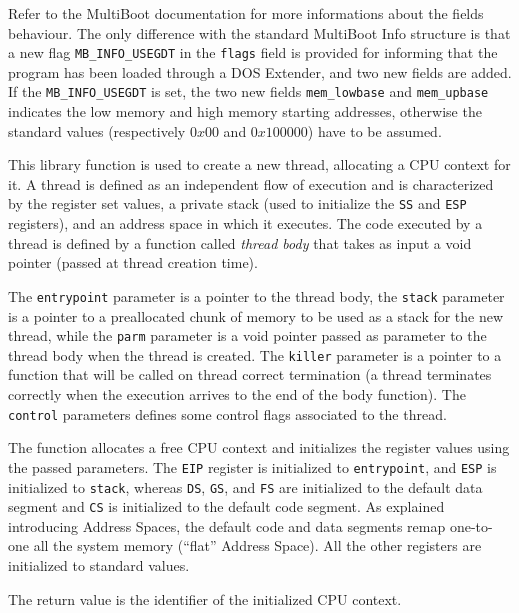 \documentclass[a4paper]{report}
\begin{document}
Refer to the MultiBoot documentation for more informations about the
fields behaviour. The only difference with the standard MultiBoot
Info structure is that a new flag {\tt MB\_INFO\_USEGDT} in the
{\tt flags} field is provided for informing that the program has been
loaded through a DOS Extender, and two new fields are added. If the
{\tt MB\_INFO\_USEGDT} is set, the two new fields {\tt mem\_lowbase}
and {\tt mem\_upbase} indicates the low memory and high memory
starting addresses, otherwise the standard values (respectively
$0x00$ and $0x100000$) have to be assumed.


This library function is used to create a new thread, allocating a
CPU context for it. A thread is defined as an independent flow of
execution and is characterized by the register set values, a private
stack (used to initialize the {\tt SS} and {\tt ESP} registers), and
an address space in which it executes. The code executed by a thread
is defined by a function called {\em thread body} that takes as input
a void pointer (passed at thread creation time).

The {\tt entrypoint} parameter is a pointer to the thread body, the
{\tt stack} parameter is a pointer to a preallocated chunk of memory
to be used as a stack for the new thread, while the {\tt parm}
parameter is a void pointer passed as parameter to the thread body
when the thread is created. The {\tt killer} parameter is a pointer
to a function that will be called on thread correct termination (a
thread terminates correctly when the execution arrives to the end of
the body function). The {\tt control} parameters defines some control
flags associated to the thread.

The function allocates a free CPU context and initializes the
register values using the passed parameters. The {\tt EIP} register
is initialized to {\tt entrypoint}, and {\tt ESP} is initialized
to {\tt stack}, whereas {\tt DS}, {\tt GS}, and {\tt FS} are
initialized to the default data segment and {\tt CS} is initialized to
the default code segment. As explained introducing Address Spaces, the
default code and data segments remap one-to-one all the system memory
(``flat'' Address Space). All the other registers are initialized to
standard values.

The return value is the  identifier of the initialized CPU context.
\end{document}
